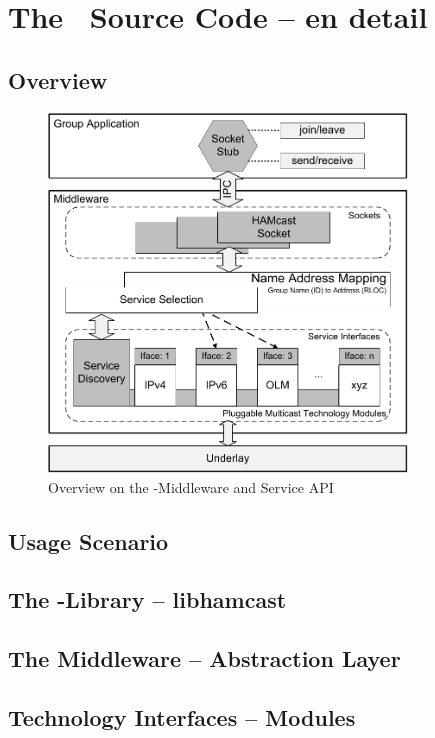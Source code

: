 \section{The \hamcast\ Source Code -- en detail}
\label{sec:code}

\subsection{Overview}

\begin{figure}[htp]
    \centering
    \includegraphics[width=0.85\textwidth]{figs/middleware}
    \caption{Overview on the \hamcast-Middleware and Service API}
    \label{fig:middleware}
\end{figure}

\subsection{Usage Scenario}

\subsection{The \hamcast-Library -- libhamcast}

\subsection{The Middleware -- Abstraction Layer}

\subsection{Technology Interfaces -- Modules}

